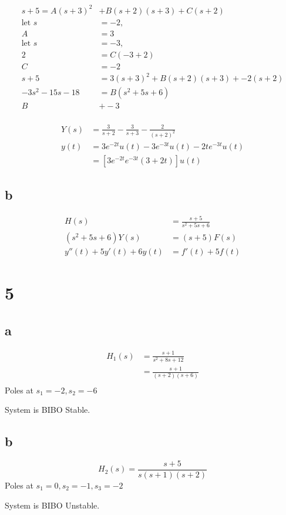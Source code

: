 \documentclass{article}
\begin{document}
\begin{multicols}{2}
\begin{align*}
    s+5 = A(s+3)^2 &+ B(s+2)(s+3) + C(s+2)\\
    \text{let } s &= -2,\\
    A &= 3\\
    \text{let } s &= -3,\\
    2 &= C(-3+2)\\
    C &= -2\\
    s+5 &= 3(s+3)^2 + B(s+2)(s+3) + -2(s+2)\\
    -3s^2-15s-18 &= B(s^2+5s+6)\\
    B &+ -3\\
\end{align*}

\begin{align*}
    Y(s) &= \frac{3}{s+2} - \frac{3}{s+3} - \frac{2}{(s+2)^2}\\
    y(t) &= 3 e^{-2t} u(t) - 3 e^{-3t} u(t) - 2t e^{-3t}u(t)\\
    &= \left[ 3e^{-2t} e^{-3t} (3+2t) \right] u(t)
\end{align*}
\subsection*{b}
\begin{align*}
    H(s) &= \frac{s+5}{s^2+5s+6}\\
    (s^2 +5s +6) Y(s) &= (s+5) F(s)\\
    y''(t) + 5 y'(t) + 6y(t) &= f'(t) + 5 f(t)
\end{align*}
\section*{5}
\subsection*{a}
\begin{align*}
    H_1(s) &= \frac{s+1}{s^2+8s+12}\\
    &= \frac{s+1}{(s+2)(s+6)}\\
\end{align*}
Poles at $s_1 = -2, s_2 = -6$

System is BIBO Stable.
\subsection*{b}
$$
H_2(s) = \frac{s+5}{s(s+1)(s+2)}
$$
Poles at $s_1 = 0, s_2 = -1, s_3 = -2$

System is BIBO Unstable.

\end{multicols}
\end{document}
